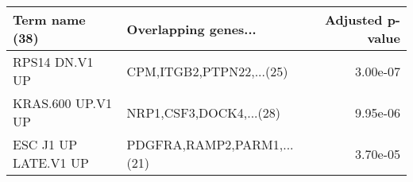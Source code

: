 \begin{tabular}{llr}
\toprule
      Term name (38) &       Overlapping genes... &  Adjusted p-value \\
\midrule
      RPS14 DN.V1 UP &   CPM,ITGB2,PTPN22,...(25) &          3.00e-07 \\
   KRAS.600 UP.V1 UP &    NRP1,CSF3,DOCK4,...(28) &          9.95e-06 \\
ESC J1 UP LATE.V1 UP & PDGFRA,RAMP2,PARM1,...(21) &          3.70e-05 \\
\bottomrule
\end{tabular}
